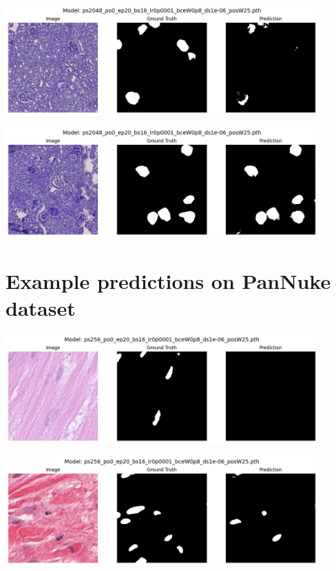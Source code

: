 \documentclass[12pt]{article}
\begin{document}
\includegraphics[width=0.9\textwidth]{Images/big_semi_good.png}
\vspace{1cm}

\includegraphics[width=0.9\textwidth]{Images/big_good.png}

\newpage

\section{Example predictions on PanNuke dataset}

\includegraphics[width=0.9\textwidth]{Images/pannuke_bad.png}
\vspace{1cm}

\includegraphics[width=0.9\textwidth]{Images/pannuke_semi_good.png}
\vspace{1cm}
\end{document}
